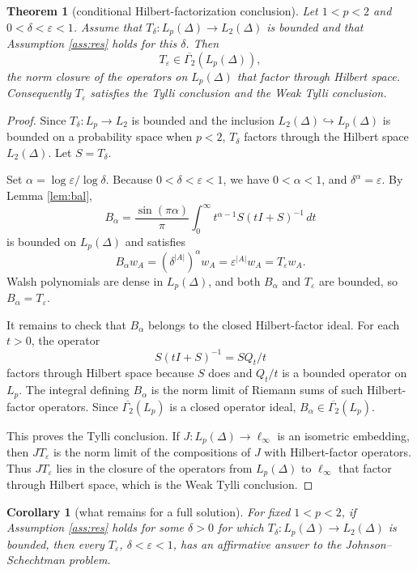 \documentclass[11pt]{article}
\newcommand{\DeltaG}{\Delta}
\newcommand{\eps}{\varepsilon}
\newcommand{\clGam}{\overline{\Gamma_2}}
\newtheorem{theorem}{Theorem}
\newtheorem{corollary}{Corollary}
\begin{document}
\begin{theorem}[conditional Hilbert-factorization conclusion]
\label{thm:conditional}
Let \(1<p<2\) and \(0<\delta<\eps<1\). Assume that
\(T_\delta:L_p(\DeltaG)\to L_2(\DeltaG)\) is bounded and that Assumption
\ref{ass:res} holds for this \(\delta\). Then
\[
        T_\eps\in \clGam(L_p(\DeltaG)),
\]
the norm closure of the operators on \(L_p(\DeltaG)\) that factor through
Hilbert space. Consequently \(T_\eps\) satisfies the Tylli conclusion and the
Weak Tylli conclusion.
\end{theorem}

\begin{proof}
Since \(T_\delta:L_p\to L_2\) is bounded and the inclusion
\(L_2(\DeltaG)\hookrightarrow L_p(\DeltaG)\) is bounded on a probability
space when \(p<2\), \(T_\delta\) factors through the Hilbert space
\(L_2(\DeltaG)\). Let \(S=T_\delta\).

Set \(\alpha=\log\eps/\log\delta\). Because \(0<\delta<\eps<1\), we have
\(0<\alpha<1\), and \(\delta^\alpha=\eps\). By Lemma \ref{lem:bal},
\[
        B_\alpha=
        \frac{\sin(\pi\alpha)}{\pi}\int_0^\infty
        t^{\alpha-1}S(tI+S)^{-1}\,dt
\]
is bounded on \(L_p(\DeltaG)\) and satisfies
\[
        B_\alpha w_A=(\delta^{|A|})^\alpha w_A=\eps^{|A|}w_A
        =T_\eps w_A.
\]
Walsh polynomials are dense in \(L_p(\DeltaG)\), and both \(B_\alpha\) and
\(T_\eps\) are bounded, so \(B_\alpha=T_\eps\).

It remains to check that \(B_\alpha\) belongs to the closed Hilbert-factor
ideal. For each \(t>0\), the operator
\[
        S(tI+S)^{-1}=S Q_t/t
\]
factors through Hilbert space because \(S\) does and \(Q_t/t\) is a bounded
operator on \(L_p\). The integral defining \(B_\alpha\) is the norm limit of
Riemann sums of such Hilbert-factor operators. Since \(\clGam(L_p)\) is a
closed operator ideal, \(B_\alpha\in\clGam(L_p)\).

This proves the Tylli conclusion. If \(J:L_p(\DeltaG)\to\ell_\infty\) is an
isometric embedding, then \(JT_\eps\) is the norm limit of the compositions of
\(J\) with Hilbert-factor operators. Thus \(JT_\eps\) lies in the closure of
the operators from \(L_p(\DeltaG)\) to \(\ell_\infty\) that factor through
Hilbert space, which is the Weak Tylli conclusion.
\end{proof}

\begin{corollary}[what remains for a full solution]
For fixed \(1<p<2\), if Assumption \ref{ass:res} holds for some
\(\delta>0\) for which \(T_\delta:L_p(\DeltaG)\to L_2(\DeltaG)\) is bounded,
then every \(T_\eps\), \(\delta<\eps<1\), has an affirmative answer to the
Johnson--Schechtman problem.
\end{corollary}
\end{document}
